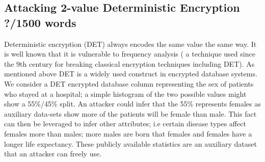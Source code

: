 \documentclass[journal]{IEEEtran}
\begin{document}
\subsection{Attacking 2-value Deterministic Encryption ?/1500 words}
Deterministic encryption (DET) always encodes the same value the same way. It is well known that it is vulnerable to frequency analysis ( a technique used since the 9th century\cite{Arab} for breaking classical encryption techniques including DET). As mentioned above DET is a widely used construct in encrypted database systems. We consider a DET encrypted database column representing the sex of patients who stayed at a hospital; a simple histogram of the two possible values might show a 55\%/45\% split. An attacker could infer that the 55\% represents females as auxiliary data-sets show more of the patients will be female \cite{InfrenceAttacks} than male. This fact can then be leveraged to infer other attributes; i.e certain disease types affect females more than males; more males are born that females and females have a longer life expectancy. These publicly available statistics are an auxiliary dataset that an attacker can freely use. 
\end{document}
